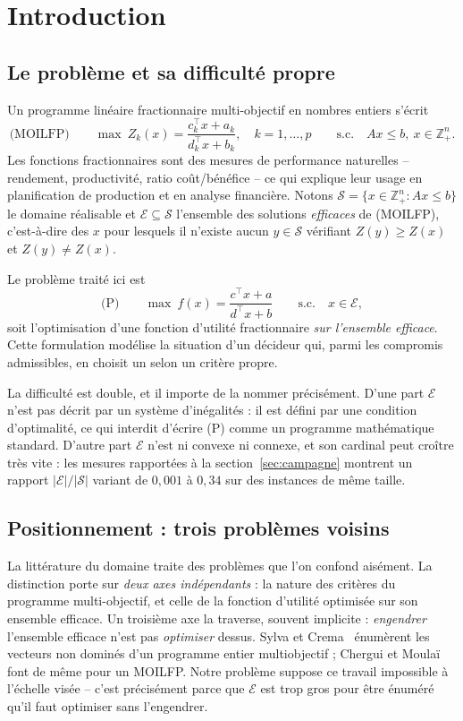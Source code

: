 \documentclass[11pt,a4paper]{article}
\theoremstyle{plain}
\theoremstyle{remark}
\newcommand{\Zk}{Z_k}
\newcommand{\Ecal}{\mathcal{E}}
\newcommand{\Scal}{\mathcal{S}}
\begin{document}
\tableofcontents

\bigskip

\section{Introduction}

\subsection{Le problème et sa difficulté propre}

Un programme linéaire fractionnaire multi-objectif en nombres entiers
s'écrit
\[
  \text{(MOILFP)}\qquad
  \max\ \Zk(x)=\frac{c_k^{\!\top}x+a_k}{d_k^{\!\top}x+b_k},\quad k=1,\dots,p
  \qquad\text{s.c.}\quad Ax\le b,\ x\in\mathbb{Z}^n_+ .
\]
Les fonctions fractionnaires sont des mesures de performance naturelles --
rendement, productivité, ratio coût/bénéfice -- ce qui explique leur usage en
planification de production et en analyse financière. Notons
$\Scal=\{x\in\mathbb{Z}^n_+ : Ax\le b\}$ le domaine réalisable et
$\Ecal\subseteq\Scal$ l'ensemble des solutions \emph{efficaces} de (MOILFP),
c'est-à-dire des $x$ pour lesquels il n'existe aucun $y\in\Scal$ vérifiant
$Z(y)\ge Z(x)$ et $Z(y)\ne Z(x)$.

Le problème traité ici est
\[
  \text{(P)}\qquad \max\ f(x)=\frac{c^{\!\top}x+a}{d^{\!\top}x+b}
  \qquad\text{s.c.}\quad x\in\Ecal ,
\]
soit l'optimisation d'une fonction d'utilité fractionnaire \emph{sur
l'ensemble efficace}. Cette formulation modélise la situation d'un décideur
qui, parmi les compromis admissibles, en choisit un selon un critère propre.

La difficulté est double, et il importe de la nommer précisément.
D'une part $\Ecal$ n'est pas décrit par un système d'inégalités : il est
défini par une condition d'optimalité, ce qui interdit d'écrire (P) comme un
programme mathématique standard. D'autre part $\Ecal$ n'est ni convexe ni
connexe, et son cardinal peut croître très vite : les mesures rapportées à la
section~\ref{sec:campagne} montrent un rapport $|\Ecal|/|\Scal|$ variant de
$0{,}001$ à $0{,}34$ sur des instances de même taille.

\subsection{Positionnement : trois problèmes voisins}
\label{sec:position}

La littérature du domaine traite des problèmes que l'on confond aisément.
La distinction porte sur \emph{deux axes indépendants} : la nature des
critères du programme multi-objectif, et celle de la fonction d'utilité
optimisée sur son ensemble efficace. Un troisième axe la traverse, souvent
implicite : \emph{engendrer} l'ensemble efficace n'est pas \emph{optimiser}
dessus. Sylva et Crema~\cite{sylva2004} énumèrent les vecteurs non dominés
d'un programme entier multiobjectif ; Chergui et Moulaï~\cite{chergui2008}
font de même pour un MOILFP. Notre problème suppose ce travail impossible à
l'échelle visée -- c'est précisément parce que $\Ecal$ est trop gros pour
être énuméré qu'il faut optimiser sans l'engendrer.
\end{document}
